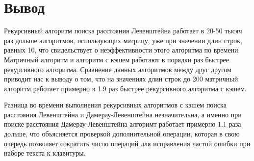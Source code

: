 \section{Вывод}

Рекурсивный алгоритм поиска расстояния Левенштейна работает в 20-50 тысяч раз
дольше алгоритмов, использующих матрицу, уже при значении длин строк, равных
10, что свидельствует о неэффективности этого алгоритма по времени. Матричный
алгоритм и алгоритм с кэшем работают в порядки раз быстрее рекурсивного
алгоритма. Сравнение данных алгоритмов между друг другом приводит нас к выводу
о том, что на значениях длин строк до 200 матричный алгоритм работает примерно
в 1.9 раз быстрее рекурсивного алгоритма с кэшем.

Разница во времени выполнения рекурсивных алгоритмов с кэшем поиска расстояния
Левенштейна и Дамерау-Левенштейна незначительна, а именно при поиске
расстояния Дамерау-Левенштейна алгоримт работает примерно 1.1 раза дольше,
что объясняется проверкой дополнительной операции, которая в свою очередь
позволяет сократить число операций для исправления частой ошибки при наборе
текста к клавитуры.
